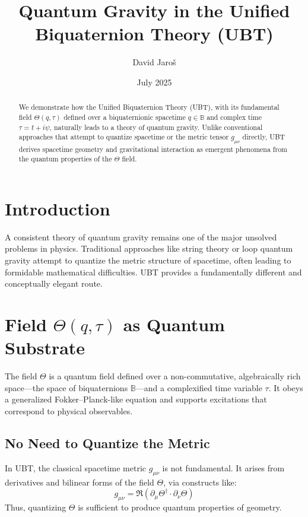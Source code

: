 \documentclass[12pt]{article}
\title{\textbf{Quantum Gravity in the Unified Biquaternion Theory (UBT)}}
\author{David Jaroš}
\affil{\texttt{jdavid.cz@gmail.com}}
\date{July 2025}
\begin{document}
\maketitle


\SpeculativeContentWarning

\begin{abstract}
We demonstrate how the Unified Biquaternion Theory (UBT), with its fundamental field $\Theta(q, \tau)$ defined over a biquaternionic spacetime $q \in \mathbb{B}$ and complex time $\tau = t + i\psi$, naturally leads to a theory of quantum gravity. Unlike conventional approaches that attempt to quantize spacetime or the metric tensor $g_{\mu\nu}$ directly, UBT derives spacetime geometry and gravitational interaction as emergent phenomena from the quantum properties of the $\Theta$ field.
\end{abstract}

\section{Introduction}

A consistent theory of quantum gravity remains one of the major unsolved problems in physics. Traditional approaches like string theory or loop quantum gravity attempt to quantize the metric structure of spacetime, often leading to formidable mathematical difficulties. UBT provides a fundamentally different and conceptually elegant route.

\section{Field $\Theta(q, \tau)$ as Quantum Substrate}

The field $\Theta$ is a quantum field defined over a non-commutative, algebraically rich space---the space of biquaternions $\mathbb{B}$---and a complexified time variable $\tau$. It obeys a generalized Fokker–Planck-like equation and supports excitations that correspond to physical observables.

\subsection{No Need to Quantize the Metric}

In UBT, the classical spacetime metric $g_{\mu\nu}$ is not fundamental. It arises from derivatives and bilinear forms of the field $\Theta$, via constructs like:
\[
g_{\mu\nu} = \Re\left(\partial_\mu \Theta^\dagger \cdot \partial_\nu \Theta \right)
\]
Thus, quantizing $\Theta$ is sufficient to produce quantum properties of geometry.
\end{document}
